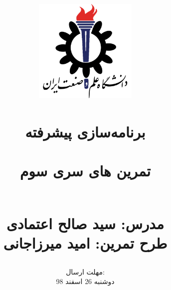 \title{
    \center
    \includegraphics[width=5cm, height=5cm]{images/IUST_logo_color.png} \\
    \textsc{} \\
    [25pt] 
    
برنامه‌سازی پیشرفته\\
\\تمرین های سری سوم

 \textsc{\rl{}} \\

مدرس: سید صالح اعتمادی \\

طرح تمرین: امید میرزاجانی
}
\author{
\selectfont
}
\date{
    مهلت ارسال:\\
دوشنبه 26 اسفند 98
}